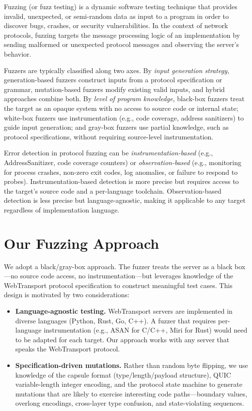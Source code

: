 Fuzzing (or fuzz testing) is a dynamic software testing technique that provides invalid, unexpected, or semi-random data as input to a program in order to discover bugs, crashes, or security vulnerabilities. In the context of network protocols, fuzzing targets the message processing logic of an implementation by sending malformed or unexpected protocol messages and observing the server's behavior.

Fuzzers are typically classified along two axes. By \emph{input generation strategy}, generation-based fuzzers construct inputs from a protocol specification or grammar, mutation-based fuzzers modify existing valid inputs, and hybrid approaches combine both. By \emph{level of program knowledge}, black-box fuzzers treat the target as an opaque system with no access to source code or internal state; white-box fuzzers use instrumentation (e.g., code coverage, address sanitizers) to guide input generation; and gray-box fuzzers use partial knowledge, such as protocol specifications, without requiring source-level instrumentation.

Error detection in protocol fuzzing can be \emph{instrumentation-based} (e.g., AddressSanitizer, code coverage counters) or \emph{observation-based} (e.g., monitoring for process crashes, non-zero exit codes, log anomalies, or failure to respond to probes). Instrumentation-based detection is more precise but requires access to the target's source code and a per-language toolchain. Observation-based detection is less precise but language-agnostic, making it applicable to any target regardless of implementation language.

\section{Our Fuzzing Approach}

We adopt a black/gray-box approach. The fuzzer treats the server as a black box---no source code access, no instrumentation---but leverages knowledge of the WebTransport protocol specification to construct meaningful test cases. This design is motivated by two considerations:

\begin{itemize}
    \item \textbf{Language-agnostic testing.} WebTransport servers are implemented in diverse languages (Python, Rust, Go, C++). A fuzzer that requires per-language instrumentation (e.g., ASAN for C/C++, Miri for Rust) would need to be adapted for each target. Our approach works with any server that speaks the WebTransport protocol.
    \item \textbf{Specification-driven mutations.} Rather than random byte flipping, we use knowledge of the capsule format (type/length/payload structure), QUIC variable-length integer encoding, and the protocol state machine to generate mutations that are likely to exercise interesting code paths---boundary values, overlong encodings, cross-layer type confusion, and state-violating sequences.
\end{itemize}

